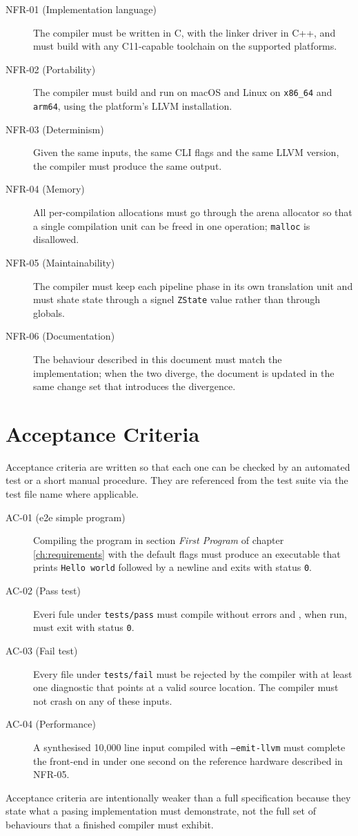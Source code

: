 \begin{description}
    \item[NFR-01 (Implementation language)] The compiler must be written in C, with the linker driver in C++, and must build with any C11-capable toolchain on the supported platforms.
    \item[NFR-02 (Portability)] The compiler must build and run on macOS and Linux on \texttt{x86\_64} and \texttt{arm64}, using the platform's LLVM installation.
    \item[NFR-03 (Determinism)] Given the same inputs, the same CLI flags and the same LLVM version, the compiler must produce the same output.
    \item[NFR-04 (Memory)] All per-compilation allocations must go through the arena allocator so that a single compilation unit can be freed in one operation; \texttt{malloc} is disallowed.
    \item[NFR-05 (Maintainability)] The compiler must keep each pipeline phase in its own translation unit and must shate state through a signel \texttt{ZState} value rather than through globals.
    \item[NFR-06 (Documentation)] The behaviour described in this document must match the implementation; when the two diverge, the document is updated in the same change set that introduces the divergence.
\end{description}

\section{Acceptance Criteria}
\label{sec:acceptance_criteria}

Acceptance criteria are written so that each one can be checked by an automated test or a short manual procedure. They are referenced from the test suite via the test file name where applicable.

\begin{description}
    \item[AC-01 (e2e simple program)] Compiling the program in section \emph{First Program} of chapter \ref{ch:requirements} with the default flags must produce an executable that prints \texttt{Hello world} followed by a newline and exits with status \texttt{0}.
    \item[AC-02 (Pass test)] Everi fule under \texttt{tests/pass} must compile without errors and , when run, must exit with status \texttt{0}.
    \item[AC-03 (Fail test)] Every file under \texttt{tests/fail} must be rejected by the compiler with at least one diagnostic that points at a valid source location. The compiler must not crash on any of these inputs.
    \item[AC-04 (Performance)] A synthesised 10,000 line input compiled with \texttt{--emit-llvm} must complete the front-end in under one second on the reference hardware described in NFR-05.
\end{description}

\begin{note}
Acceptance criteria are intentionally weaker than a full specification because they state what a pasing implementation must demonstrate, not the full set of behaviours that a finished compiler must exhibit.
\end{note}

